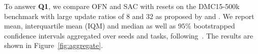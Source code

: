 

To answer \textbf{Q1}, we compare OFN and SAC with resets on the DMC15-500k benchmark with large update ratios of $8$ and $32$ as proposed by \textcite{nikishin2022primacy} and  \textcite{schwarzer2023bigger}.  We report mean, interquartile mean (IQM) and median as well as $95\%$ bootstrapped confidence intervals aggregated over seeds and tasks,  following~\textcite{agarwal2021deep}. The results are shown in Figure~\ref{fig:aggregate}.

